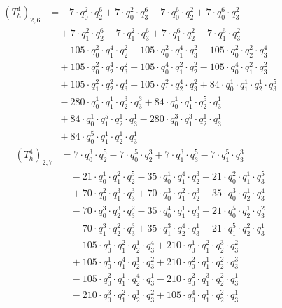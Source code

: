 \begin{align*}(T_{h}^4)_{2,6}&=-7\cdot q_0^{2}\cdot q_2^{6}+7\cdot q_0^{2}\cdot q_3^{6}-7\cdot q_0^{6}\cdot q_2^{2}+7\cdot q_0^{6}\cdot q_3^{2}\\
&\quad +7\cdot q_1^{2}\cdot q_2^{6}-7\cdot q_1^{2}\cdot q_3^{6}+7\cdot q_1^{6}\cdot q_2^{2}-7\cdot q_1^{6}\cdot q_3^{2}\\
&\quad -105\cdot q_0^{2}\cdot q_1^{4}\cdot q_2^{2}+105\cdot q_0^{2}\cdot q_1^{4}\cdot q_3^{2}-105\cdot q_0^{2}\cdot q_2^{2}\cdot q_3^{4}\\
&\quad +105\cdot q_0^{2}\cdot q_2^{4}\cdot q_3^{2}+105\cdot q_0^{4}\cdot q_1^{2}\cdot q_2^{2}-105\cdot q_0^{4}\cdot q_1^{2}\cdot q_3^{2}\\
&\quad +105\cdot q_1^{2}\cdot q_2^{2}\cdot q_3^{4}-105\cdot q_1^{2}\cdot q_2^{4}\cdot q_3^{2}+84\cdot q_0^{1}\cdot q_1^{1}\cdot q_2^{1}\cdot q_3^{5}\\
&\quad -280\cdot q_0^{1}\cdot q_1^{1}\cdot q_2^{3}\cdot q_3^{3}+84\cdot q_0^{1}\cdot q_1^{1}\cdot q_2^{5}\cdot q_3^{1}\\
&\quad +84\cdot q_0^{1}\cdot q_1^{5}\cdot q_2^{1}\cdot q_3^{1}-280\cdot q_0^{3}\cdot q_1^{3}\cdot q_2^{1}\cdot q_3^{1}\\
&\quad +84\cdot q_0^{5}\cdot q_1^{1}\cdot q_2^{1}\cdot q_3^{1}\end{align*}
\begin{align*}(T_{h}^4)_{2,7}&=7\cdot q_0^{3}\cdot q_2^{5}-7\cdot q_0^{5}\cdot q_2^{3}+7\cdot q_1^{3}\cdot q_3^{5}-7\cdot q_1^{5}\cdot q_3^{3}\\
&\quad -21\cdot q_0^{1}\cdot q_1^{2}\cdot q_2^{5}-35\cdot q_0^{1}\cdot q_1^{4}\cdot q_2^{3}-21\cdot q_0^{2}\cdot q_1^{1}\cdot q_3^{5}\\
&\quad +70\cdot q_0^{2}\cdot q_1^{3}\cdot q_3^{3}+70\cdot q_0^{3}\cdot q_1^{2}\cdot q_2^{3}+35\cdot q_0^{3}\cdot q_2^{1}\cdot q_3^{4}\\
&\quad -70\cdot q_0^{3}\cdot q_2^{3}\cdot q_3^{2}-35\cdot q_0^{4}\cdot q_1^{1}\cdot q_3^{3}+21\cdot q_0^{5}\cdot q_2^{1}\cdot q_3^{2}\\
&\quad -70\cdot q_1^{3}\cdot q_2^{2}\cdot q_3^{3}+35\cdot q_1^{3}\cdot q_2^{4}\cdot q_3^{1}+21\cdot q_1^{5}\cdot q_2^{2}\cdot q_3^{1}\\
&\quad -105\cdot q_0^{1}\cdot q_1^{2}\cdot q_2^{1}\cdot q_3^{4}+210\cdot q_0^{1}\cdot q_1^{2}\cdot q_2^{3}\cdot q_3^{2}\\
&\quad +105\cdot q_0^{1}\cdot q_1^{4}\cdot q_2^{1}\cdot q_3^{2}+210\cdot q_0^{2}\cdot q_1^{1}\cdot q_2^{2}\cdot q_3^{3}\\
&\quad -105\cdot q_0^{2}\cdot q_1^{1}\cdot q_2^{4}\cdot q_3^{1}-210\cdot q_0^{2}\cdot q_1^{3}\cdot q_2^{2}\cdot q_3^{1}\\
&\quad -210\cdot q_0^{3}\cdot q_1^{2}\cdot q_2^{1}\cdot q_3^{2}+105\cdot q_0^{4}\cdot q_1^{1}\cdot q_2^{2}\cdot q_3^{1}\end{align*}
